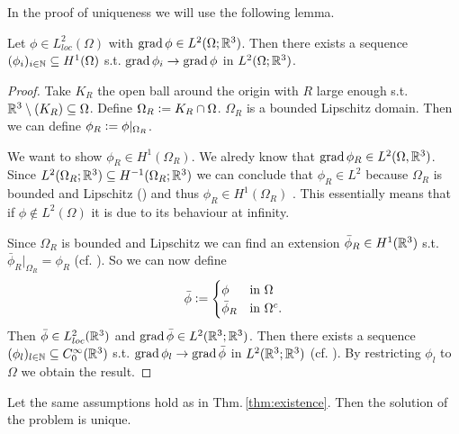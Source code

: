 \documentclass[../master_thesis.tex]{subfiles}
\begin{document}
In the proof of uniqueness we will use the following lemma. 
\begin{lemma}\label{lem:gradient_sequence}
    Let $\phi \in L^2_{loc}(\Omega)$ 
    with $\operatorname{grad} \phi \in L^2(\Omega;\mathbb{R}^3)$. Then 
    there exists a sequence $(\phi_i)_{i \in \mathbb{N}} \subseteq H^1(\Omega)$
    s.t. $\operatorname{grad} \phi_i \rightarrow \operatorname{grad} \phi$ in $L^2(\Omega;\mathbb{R}^3)$.
\end{lemma}
\begin{proof}
    Take $K_R$ the open ball around the origin with $R$ large enough 
    s.t. $\mathbb{R}^3 \setminus (K_R) \subseteq \Omega$. 
    Define $\Omega_R \vcentcolon= K_R \cap \Omega$. $\Omega_R$ is a bounded Lipschitz 
    domain.
    Then we can define $\phi_R \vcentcolon= \phi|_{\Omega_R}$.

    We want to show $\phi_R \in H^1(\Omega_R)$. We alredy know that $\operatorname{grad} \phi_R \in L^2(\Omega, \mathbb{R}^3)$.
    Since $L^2(\Omega_R; \mathbb{R}^3) \subseteq H^{-1}(\Omega_R;\mathbb{R}^3)$ we can conclude that 
    $\phi_R \in L^2$ because $\Omega_R$ is bounded and Lipschitz (\cite[Lemma 3.11]{monk}) 
    and thus $\phi_R \in H^1(\Omega_R)$ . This essentially means that 
    if $\phi \notin L^2(\Omega)$ it is due to its behaviour at infinity.

    Since $\Omega_R$ is bounded and Lipschitz we can find an extension $\bar{\phi}_R \in H^1(\mathbb{R}^3)$ 
    s.t. $\bar{\phi}_R|_{\Omega_R} =\phi_R$ (cf. \cite[Sec.\,1.5.1]{mazya}).
    So we can now define
    \begin{align*}
    \bar{\phi} \vcentcolon=
    \begin{cases}
        \phi & \mbox{in $\Omega$}\\
        \bar{\phi}_R & \mbox{in $\Omega^c$.}\\
    \end{cases}
    \end{align*}
    Then $\bar{\phi} \in L^2_{loc}(\mathbb{R}^3)$ and 
    $\operatorname{grad} \bar{\phi} \in L^2(\mathbb{R}^3;\mathbb{R}^3)$. 
    Then there exists a sequence 
    $(\phi_l) _{l \in \mathbb{N}} \subseteq C^\infty_0(\mathbb{R}^3)$ s.t.
    $\operatorname{grad} \phi_l \rightarrow \operatorname{grad} \bar{\phi}$ in $L^2(\mathbb{R}^3;\mathbb{R}^3)$ 
    (cf. \cite[Lemma 1.1]{simader}). By restricting $\phi_l$ to $\Omega$ 
    we obtain the result.
\end{proof}


\begin{theorem}
    Let the same assumptions hold as in Thm.\,\ref{thm:existence}.
    Then the solution of the problem is unique.
\end{theorem}
\end{document}
